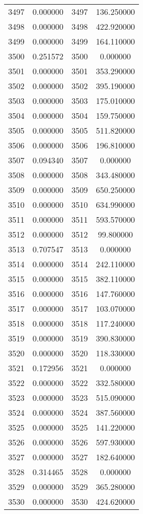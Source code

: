 \documentclass[12pt]{article}
\begin{document}
\begin{longtable}{@{}cccc@{}}
3497 & 0.000000 & 3497 & 136.250000 \\
3498 & 0.000000 & 3498 & 422.920000 \\
3499 & 0.000000 & 3499 & 164.110000 \\
3500 & 0.251572 & 3500 & 0.000000 \\
3501 & 0.000000 & 3501 & 353.290000 \\
3502 & 0.000000 & 3502 & 395.190000 \\
3503 & 0.000000 & 3503 & 175.010000 \\
3504 & 0.000000 & 3504 & 159.750000 \\
3505 & 0.000000 & 3505 & 511.820000 \\
3506 & 0.000000 & 3506 & 196.810000 \\
3507 & 0.094340 & 3507 & 0.000000 \\
3508 & 0.000000 & 3508 & 343.480000 \\
3509 & 0.000000 & 3509 & 650.250000 \\
3510 & 0.000000 & 3510 & 634.990000 \\
3511 & 0.000000 & 3511 & 593.570000 \\
3512 & 0.000000 & 3512 & 99.800000 \\
3513 & 0.707547 & 3513 & 0.000000 \\
3514 & 0.000000 & 3514 & 242.110000 \\
3515 & 0.000000 & 3515 & 382.110000 \\
3516 & 0.000000 & 3516 & 147.760000 \\
3517 & 0.000000 & 3517 & 103.070000 \\
3518 & 0.000000 & 3518 & 117.240000 \\
3519 & 0.000000 & 3519 & 390.830000 \\
3520 & 0.000000 & 3520 & 118.330000 \\
3521 & 0.172956 & 3521 & 0.000000 \\
3522 & 0.000000 & 3522 & 332.580000 \\
3523 & 0.000000 & 3523 & 515.090000 \\
3524 & 0.000000 & 3524 & 387.560000 \\
3525 & 0.000000 & 3525 & 141.220000 \\
3526 & 0.000000 & 3526 & 597.930000 \\
3527 & 0.000000 & 3527 & 182.640000 \\
3528 & 0.314465 & 3528 & 0.000000 \\
3529 & 0.000000 & 3529 & 365.280000 \\
3530 & 0.000000 & 3530 & 424.620000 \\

\end{longtable}
\end{document}
